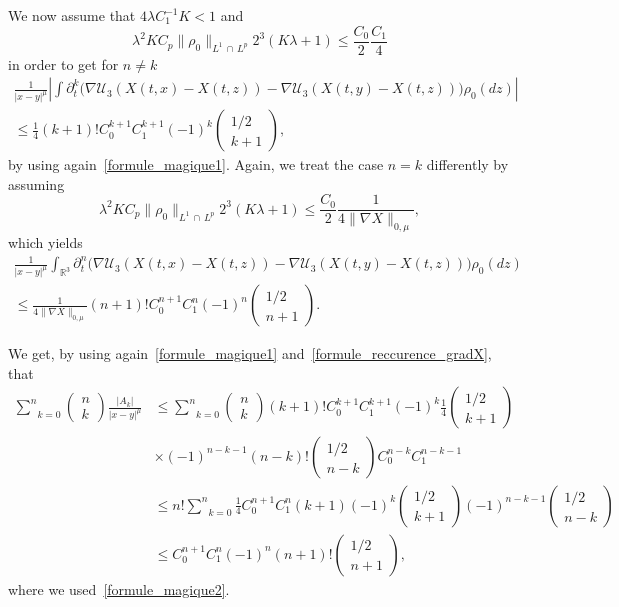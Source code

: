 \documentclass[10pt]{amsart}
\theoremstyle{definition}\newtheorem{defi}[theo]{Definition}\newtheorem{rema}[theo]{Remark}\newtheorem{exam}[theo]{Example}\newtheorem{exem}[theo]{Example}\newtheorem{nota}[theo]{Notation}
\newcommand{\R}{\mathbb{R}}
\newcommand{\clU}{\mathcal{U}}
\renewcommand{\leq}{\leqslant}
\begin{document}
We now assume that $4\lambda C_1^{-1}K<1$ and
\[
\lambda^2 K C_p \|\rho_0\|_{L^1\,\cap\,L^p}2^3(K\lambda+1)\leq \frac{C_0}{2} \frac{C_1}{4}
\]
in order to get for $n\neq k$
\begin{multline*}
\frac{1}{|x-y|^\mu}
\left| \int \partial_t^k \big(\nabla \clU_3(X(t,x)-X(t,z))-\nabla \clU_3(X(t,y)-X(t,z)) \big)\rho_0(dz) \right| \\
\leq \frac{1}{4}(k+1)!C_0^{k+1} C_1^{k+1} (-1)^k
\begin{pmatrix}
1/2\\ k+1
\end{pmatrix},
\end{multline*}
by using again~\eqref{formule_magique1}.
Again, we treat the case $n=k$ differently by assuming
\[
\lambda^2 K C_p \|\rho_0\|_{L^1\,\cap\,L^p}2^3(K\lambda+1)\leq \frac{C_0}{2} \frac{1}{4\|\nabla X\|_{0,\mu}},
\]
which yields
\begin{multline*}
\frac{1}{|x-y|^\mu}\int_{\R^3} \partial_t^n \big(\nabla \clU_3(X(t,x)-X(t,z))-\nabla \clU_3(X(t,y)-X(t,z)) \big)\rho_0(dz)\\
\leq \frac{1}{4 \|\nabla X\|_{0,\mu}}(n+1)!C_0^{n+1} C_1^{n} (-1)^n
\begin{pmatrix}
1/2\\ n+1
\end{pmatrix}.
\end{multline*}


We get, by using again~\eqref{formule_magique1} and~\eqref{formule_reccurence_gradX}, that
\begin{align*}
\underset{k=0}{\overset{n}{\sum}}
\begin{pmatrix}
n \\k
\end{pmatrix}\frac{|A_k|}{|x-y|^\mu}&\leq
\underset{k=0}{\overset{n}{\sum}}
\begin{pmatrix}
n \\k
\end{pmatrix}
(k+1)!C_0^{k+1} C_1^{k+1} (-1)^k \frac{1}{4}
\begin{pmatrix}
1/2\\ k+1
\end{pmatrix}\\
&\times (-1)^{n-k-1}(n-k)!
\begin{pmatrix}
1/2 \\ n-k
\end{pmatrix}
C_0^{n-k} C_1^{n-k-1}\\
&\leq n! \underset{k=0}{\overset{n}{\sum}}\frac{1}{4} C_0^{n+1} C_1^{n} (k+1)(-1)^k
\begin{pmatrix}
1/2\\ k+1
\end{pmatrix} (-1)^{n-k-1}
\begin{pmatrix}
1/2 \\ n-k
\end{pmatrix}
\\
&\leq C_0^{n+1} C_1^{n} (-1)^n (n+1)!
\begin{pmatrix}
1/2 \\ n+1
\end{pmatrix},
\end{align*}
where we used~\eqref{formule_magique2}.
\end{document}
